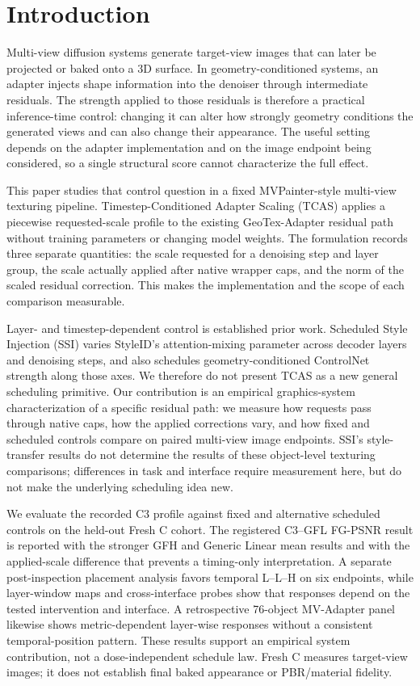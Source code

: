 \documentclass[times,twocolumn,final]{elsarticle}
\begin{document}
\linenumbers

\section{Introduction}
\label{sec:intro}

Multi-view diffusion systems generate target-view images that can later be projected or baked onto a 3D surface. In geometry-conditioned systems, an adapter injects shape information into the denoiser through intermediate residuals. The strength applied to those residuals is therefore a practical inference-time control: changing it can alter how strongly geometry conditions the generated views and can also change their appearance. The useful setting depends on the adapter implementation and on the image endpoint being considered, so a single structural score cannot characterize the full effect.

This paper studies that control question in a fixed MVPainter-style multi-view texturing pipeline. Timestep-Conditioned Adapter Scaling (TCAS) applies a piecewise requested-scale profile to the existing GeoTex-Adapter residual path without training parameters or changing model weights. The formulation records three separate quantities: the scale requested for a denoising step and layer group, the scale actually applied after native wrapper caps, and the norm of the scaled residual correction. This makes the implementation and the scope of each comparison measurable.

Layer- and timestep-dependent control is established prior work. Scheduled Style Injection (SSI) varies StyleID's attention-mixing parameter across decoder layers and denoising steps, and also schedules geometry-conditioned ControlNet strength along those axes. We therefore do not present TCAS as a new general scheduling primitive. Our contribution is an empirical graphics-system characterization of a specific residual path: we measure how requests pass through native caps, how the applied corrections vary, and how fixed and scheduled controls compare on paired multi-view image endpoints. SSI's style-transfer results do not determine the results of these object-level texturing comparisons; differences in task and interface require measurement here, but do not make the underlying scheduling idea new.

We evaluate the recorded C3 profile against fixed and alternative scheduled controls on the held-out Fresh C cohort. The registered C3--GFL FG-PSNR result is reported with the stronger GFH and Generic Linear mean results and with the applied-scale difference that prevents a timing-only interpretation. A separate post-inspection placement analysis favors temporal L--L--H on six endpoints, while layer-window maps and cross-interface probes show that responses depend on the tested intervention and interface. A retrospective 76-object MV-Adapter panel likewise shows metric-dependent layer-wise responses without a consistent temporal-position pattern. These results support an empirical system contribution, not a dose-independent schedule law. Fresh C measures target-view images; it does not establish final baked appearance or PBR/material fidelity.
\end{document}
